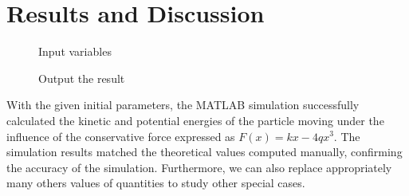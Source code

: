 \documentclass[13pt,a4paper]{report}
\begin{document}
\newpage
\section{Results and Discussion}
\begin{figure}[!htb]
    \centering
    \begin{minipage}{.375\textwidth}
        \centering
        \caption{Input variables}
        \label{fig:input}
    \end{minipage}%
    \begin{minipage}{0.625\textwidth}
        \centering
        \caption{Output the result}
        \label{fig:output}
    \end{minipage}
\end{figure}

With the given initial parameters, the MATLAB simulation successfully calculated the kinetic and potential energies of the particle moving under the influence of the conservative force expressed as $F(x) = kx - 4qx^3$. The simulation results matched the theoretical values computed manually, confirming the accuracy of the simulation. Furthermore, we can also replace appropriately many others values of quantities to study other special cases.
\end{document}
